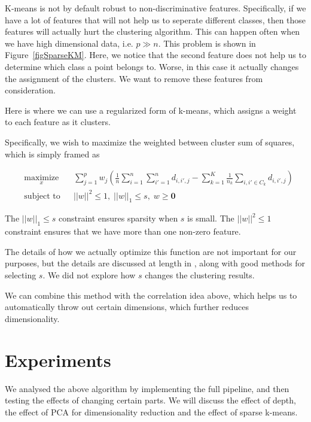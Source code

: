 \documentclass{article} %
\begin{document}
K-means is not by default robust to non-discriminative features. Specifically, if we have a lot of features that will not help us to seperate different classes, then those features will actually hurt the clustering algorithm. This can happen often when we have high dimensional data, i.e. $p \gg n$. This problem is shown in Figure~\ref{figSparseKM}. Here, we notice that the second feature does not help us to determine which class a point belongs to. Worse, in this case it actually changes the assignment of the clusters. We want to remove these features from consideration.

Here is where we can use a regularized form of k-means, which assigns a weight to each feature as it clusters.

Specifically, we wish to maximize the weighted between cluster sum of squares, which is simply framed as

\begin{equation}
\begin{aligned}
& \underset{x}{\text{maximize}}
& & \sum_{j=1}^p w_j\left(\frac{1}{n}\sum_{i=1}^n\sum_{i'=1}^nd_{i, i', j}-\sum_{k=1}^K \frac{1}{n_k}\sum_{i, i'\in C_k} d_{i, i', j}\right) \\
& \text{subject to}
& & ||w||^2 \leq 1, \; ||w||_1\leq s, \; w \geq \mathbf{0}
\end{aligned}
\end{equation}

The $||w||_1 \leq s$ constraint ensures sparsity when $s$ is small. The $||w||^2 \leq 1$ constraint ensures that we have more than one non-zero feature.

The details of how we actually optimize this function are not important for our purposes, but the details are discussed at length in \cite{tibs10}, along with good methods for selecting $s$. We did not explore how $s$ changes the clustering results.

We can combine this method with the correlation idea above, which helps us to automatically throw out certain dimensions, which further reduces dimensionality.

\section{Experiments}

We analysed the above algorithm by implementing the full pipeline, and then testing the effects of changing certain parts. We will discuss the effect of depth, the effect of PCA for dimensionality reduction and the effect of sparse k-means.
\end{document}
